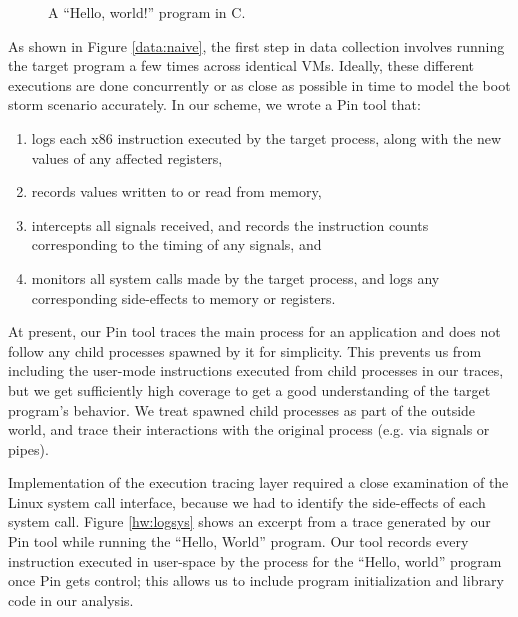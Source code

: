 \begin{figure}[h]
  
  \caption[A ``Hello, world!'' program in C.]%
          {A ``Hello, world!'' program in C. }
          \label{source:hw}
\end{figure}

 \newline
As shown in Figure \ref{data:naive}, the first step
in data collection involves running the target program
a few times across identical VMs. Ideally, these 
different executions are done concurrently or as
close as possible in time to model the boot storm scenario accurately. 
In our scheme, we wrote a Pin tool that:
\begin{enumerate}
\item logs each x86 instruction executed by 
  the target process, along with the 
  new values of any affected registers, 
\item records values written to or 
  read from memory,
\item intercepts all signals received, and records the instruction counts 
  corresponding to the timing of any signals, and
\item monitors all system calls made by the target process,
  and logs any corresponding side-effects to memory or registers.
\end{enumerate}

At present, our Pin tool traces the main process 
for an application and 
does not follow any child processes 
spawned by it for simplicity. This prevents
us from including the user-mode
instructions executed from child processes in our traces, but we get 
sufficiently high coverage to get a good understanding 
of the target program's behavior. We 
treat spawned child processes as part of the outside
world, and trace their interactions with the original process
(e.g. via signals or pipes).

Implementation of the execution tracing layer required
a close examination of the Linux system call interface,
because we had to identify the side-effects of each system call. 
Figure \ref{hw:logsys} shows an excerpt from a trace 
generated by our Pin tool while running the ``Hello, World'' 
program. Our tool records 
every instruction executed in user-space by the process
for the ``Hello, world'' program once Pin gets control; 
this allows us to include program initialization
and library code in our analysis. \newline

